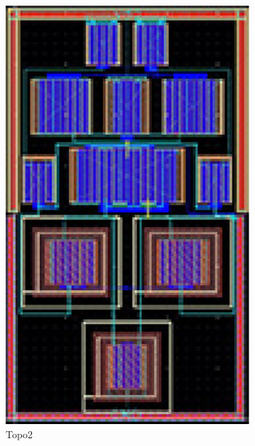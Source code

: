       \begin{figure}[ht]
        \centering
        \begin{subfigure}[t]{0.2\textwidth}
        \includegraphics[width=\textwidth]{Fig/MultTopo_Topo2.eps}
        \caption{Topo2}\label{fig:Topo2}
        \end{subfigure}
        \begin{subfigure}[t]{0.2\textwidth}

\end{subfigure}
\end{figure}
